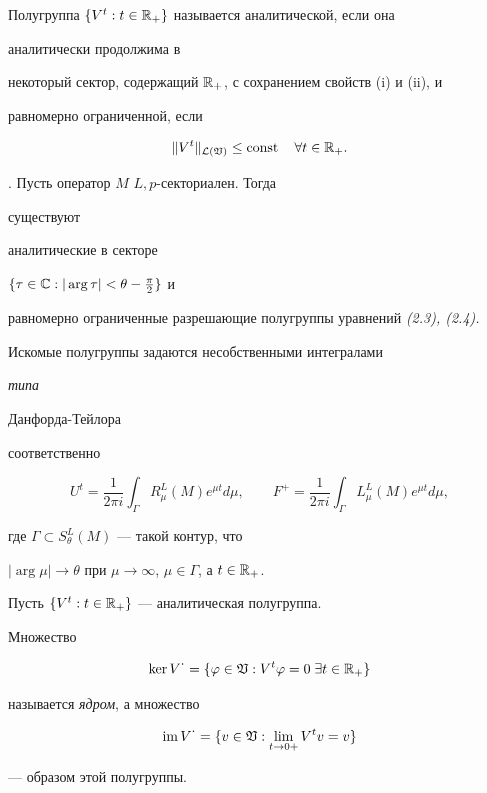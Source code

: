 Полугруппа $\{V^t:t\in\Bbb R_+\}$ называется аналитической, если она 


аналитически продолжима в 


некоторый сектор, содержащий $\Bbb R_+$, с сохранением свойств (i) и (ii), и 


равномерно ограниченной, если 


$$ 


\|V^t\|_{\cal L(\frak V)}\le\const\quad \forall t\in\Bbb R_+. 


$$ 


 


\begin{thmm} \cite{Sv5}. Пусть оператор $M$ $L,p$-секториален. Тогда 


существуют 


аналитические в секторе 


$\{\tau\in\Bbb C:|\arg \tau|<\theta-\frac{\pi}{2}\}$ и 


равномерно ограниченные разрешающие полугруппы уравнений {\em (2.3), (2.4).} 


\end{thmm} 


 


Искомые полугруппы задаются несобственными интегралами {\it типа 


Данфорда-Тейлора} соответственно 


$$ 


U^t=\frac{1}{2\pi i}\int_\Gamma R^L_\mu(M)e^{\mu t}d\mu,\qquad 


F^+=\frac{1}{2\pi i}\int_\Gamma L^L_\mu(M)e^{\mu t}d\mu, 


$$ 


где $\Gamma\subset S^L_\theta(M)$ --- такой контур, что 


$|\arg \mu|\to\theta$ при $\mu\to\infty$, $\mu\in\Gamma$, а $t\in\Bbb R_+$. 


 


\begin{defnm} Пусть $\{V^t:t\in\Bbb R_+\}$ --- аналитическая полугруппа. 


Множество 


$$ 


\ker V^{\tst\cdot} =\{\varphi\in\frak V:V^t\varphi=0\;\exists t\in\Bbb R_+\} 


$$ 


называется {\it ядром}, а множество 


$$ 


\im V^{\tst\cdot} =\{v\in\frak V:\lim_{t\to 0+}V^tv=v\} 


$$ 


--- образом этой полугруппы. 


\end{defnm} 


